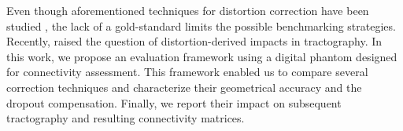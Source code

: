 Even though aforementioned techniques for distortion correction
have been studied \cite{zeng_image_2002,wu_comparison_2008},
the lack of a gold-standard limits the possible benchmarking 
strategies. Recently, \cite{irfanoglu_effects_2012} raised the question
of distortion-derived impacts in tractography.
In this work, we propose an evaluation framework
using a digital phantom designed for connectivity assessment.
This framework enabled us to compare several correction 
techniques and characterize their geometrical accuracy 
and the dropout compensation. Finally, we report their 
impact on subsequent tractography and resulting connectivity
matrices.